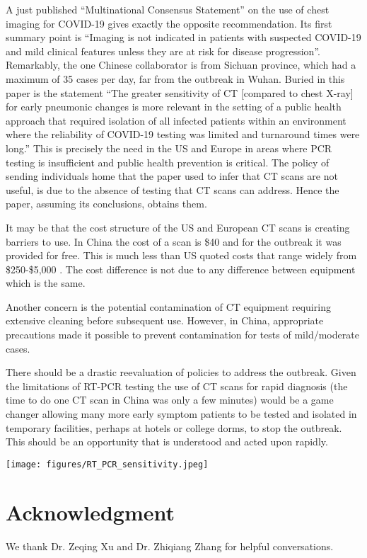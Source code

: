 \documentclass[onecolumn,journal]{IEEEtran}
\begin{document}
\begin{multicols}{2}
A just published ``Multinational Consensus Statement'' on the use of chest imaging for COVID-19 \cite{use} gives exactly the opposite recommendation. Its first summary point is ``Imaging is not indicated in patients with suspected COVID-19 and mild clinical features unless they are at risk for disease progression''. Remarkably, the one Chinese collaborator is from Sichuan province, which had a maximum of 35 cases per day, far from the outbreak in Wuhan. Buried in this paper is the statement ``The greater sensitivity of CT [compared to chest X-ray] for early pneumonic changes is more relevant in the setting of a public health approach that required isolation of all infected patients within an environment where the reliability of COVID-19 testing was limited and turnaround times were long.'' This is precisely the need in the US and Europe in areas where PCR testing is insufficient and public health prevention is critical. The policy of sending individuals home that the paper used to infer that CT scans are not useful, is due to the absence of testing that CT scans can address. Hence the paper, assuming its conclusions, obtains them. 

It may be that the cost structure of the US and European CT scans is creating barriers to use. In China the cost of a scan is \$40 and for the outbreak it was provided for free. This is much less than US quoted costs that range widely from \$250-\$5,000 \cite{cost}. The cost difference is not due to any difference between equipment which is the same.

Another concern is the potential contamination of CT equipment requiring extensive cleaning before subsequent use. However, in China, appropriate precautions made it possible to prevent contamination for tests of mild/moderate cases. 

 There should be a drastic reevaluation of policies to address the outbreak. Given the limitations of RT-PCR testing the use of CT scans for rapid diagnosis (the time to do one CT scan in China was only a few minutes) would be a game changer allowing many more early symptom patients to be tested and isolated in temporary facilities, perhaps at hotels or college dorms, to stop the outbreak. This should be an opportunity that is understood and acted upon rapidly.  
 

{\centering
  \texttt{[image: figures/RT\_PCR\_sensitivity.jpeg]}
  \par
}

\section*{Acknowledgment}
We thank Dr. Zeqing Xu and Dr. Zhiqiang Zhang for helpful conversations.

\end{multicols}
\end{document}
